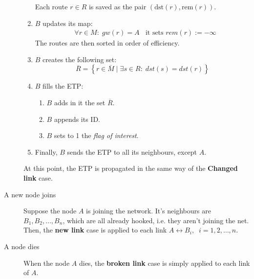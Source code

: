 \documentclass[a4paper]{article}
\newcommand{\T}[1]{\textrm{#1}}
\newcommand{\pgra}[1]{\left\{#1\right\}}
\newcommand{\eal}[1]{{\begin{align*} #1 \end{align*}}}
\def\ove#1{{\overline{#1}}}
\def\8{{\infty}}
\begin{document}
\begin{description}
\begin{enumerate}
			Each route $r\in R$ is saved as the pair $(\T{dst}(r),
			\T{rem}(r))$.
		\item \label{upmap}
			$B$ updates its map:
			\eal{&\forall r\in M:\;gw(r)=A\;\;\T{ it sets }rem(r):=-\8}
			The routes are then sorted in order of efficiency.
		\item $B$ creates the following set:
			\[
			\ove R = \pgra{r\in \ove M\;|\;\exists s\in R:\;dst(s)=dst(r)}
			\]
		\item $B$ fills the ETP: 
			\begin{enumerate}
				\item $B$ adds in it the set $\ove R$.
				\item $B$ appends its ID.
				\item $B$ sets to 1 the \emph{flag of interest}.
			\end{enumerate}
		\item Finally, $B$ sends the ETP to all its neighbours, except $A$.
		\end{enumerate}
		At this point, the ETP is propagated in the same way of the
		\textbf{Changed link} case.
	\item[A new node joins]
		Suppose the node $A$ is joining the network. It's neighbours
		are $B_1, B_2,\dots, B_n$, which are all already hooked, i.e.
		they aren't joining the net. Then, the \textbf{new link} case is
		applied to each link $A\leftrightarrow B_i,\;\;i=1,2,\dots,n$.
	\item[A node dies]
		When the node $A$ dies, the \textbf{broken link} case is
		simply applied to each link of $A$.
\end{description}
\end{document}
